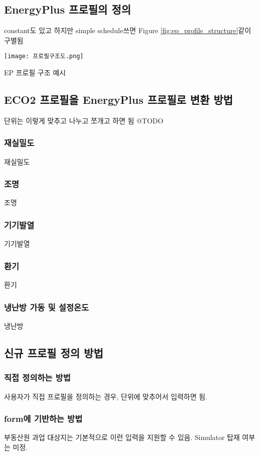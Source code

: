 \subsection{EnergyPlus 프로필의 정의}
constant도 있고 하지만 simple schedule쓰면 Figure \ref{fig:ep_profile_structure}\와 같이 구별됨

\begin{defaultfigure}
  \texttt{[image: 프로필구조도.png]}
  \caption{EP 프로필 구조 예시}
  \label{fig:ep_profile_structure}
\end{defaultfigure}

\subsection{ECO2 프로필을 EnergyPlus 프로필로 변환 방법}
단위는 이렇게 맞추고 나누고 쪼개고 하면 됨 @TODO

\subsubsection{재실밀도}
재실밀도

\subsubsection{조명}
조명

\subsubsection{기기발열}
기기발열

\subsubsection{환기}
환기

\subsubsection{냉난방 가동 및 설정온도}
냉난방

\subsection{신규 프로필 정의 방법}
\subsubsection{직접 정의하는 방법}
사용자가 직접 프로필을 정의하는 경우, 단위에 맞추어서 입력하면 됨.

\subsubsection{form에 기반하는 방법}
부동산원 과업 대상지는 기본적으로 이런 입력을 지원할 수 있음.
Simulator 탑재 여부는 미정.

